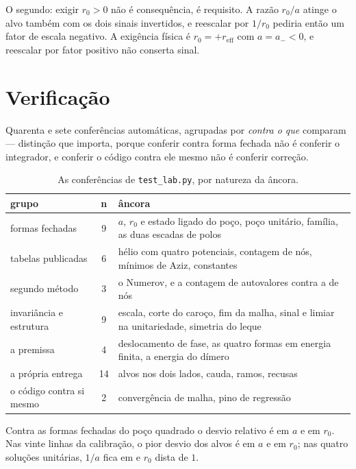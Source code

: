 \documentclass[11pt,a4paper]{article}
\newcommand{\cod}[1]{\texttt{\small #1}}
\begin{document}
O segundo: exigir $r_0>0$ não é consequência, é requisito. A razão $r_0/a$
atinge o alvo também com os dois sinais invertidos, e reescalar por $1/r_0$
pediria então um fator de escala negativo. A exigência física é
$r_0=+r_\mathrm{eff}$ com $a=a_-<0$, e reescalar por fator positivo não conserta
sinal.

\section{Verificação}

Quarenta e sete conferências automáticas, agrupadas por \emph{contra o que}
comparam --- distinção que importa, porque conferir contra forma fechada não é
conferir o integrador, e conferir o código contra ele mesmo não é conferir
correção.

\begin{table}[htbp]
\centering
\caption{As conferências de \cod{test\_lab.py}, por natureza da âncora.}
\small
\begin{tabular}{lc@{\quad}p{7.1cm}}
\toprule
grupo & n & âncora \\
\midrule
formas fechadas & 9 & $a$, $r_0$ e estado ligado do poço, poço unitário,
  família, as duas escadas de polos \\
tabelas publicadas & 6 & hélio com quatro potenciais, contagem de nós, mínimos
  de Aziz, constantes \\
segundo método & 3 & o Numerov, e a contagem de autovalores contra a de nós \\
invariância e estrutura & 9 & escala, corte do caroço, fim da malha, sinal e
  limiar na unitariedade, simetria do leque \\
a premissa & 4 & deslocamento de fase, as quatro formas em energia finita, a
  energia do dímero \\
a própria entrega & 14 & alvos nos dois lados, cauda, ramos, recusas \\
o código contra si mesmo & 2 & convergência de malha, pino de regressão \\
\bottomrule
\end{tabular}
\end{table}

Contra as formas fechadas do poço quadrado o desvio relativo é \EtrychPocoA{}
em $a$ e \EtrychPocoRzero{} em $r_0$. Nas vinte linhas da calibração, o pior
desvio dos alvos é \EtrychAlvoA{} em $a$ e \EtrychAlvoRzero{} em $r_0$; nas
quatro soluções unitárias, $1/a$ fica em \EtrychUnitInv{} e $r_0$ dista
\EtrychUnitRzero{} de $1$.
\end{document}
